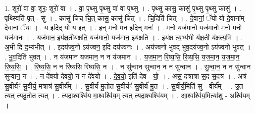\documentclass[17pt]{extarticle}
\begin{document}
1. शूरो॑ वा वा॒ शूरः॒ शूरो॑ वा । . वा॒ पृ॒थ्सु पृ॒थ्सु वा॑ वा पृ॒थ्सु । . पृ॒थ्सु कासु॒ कासु॑ पृ॒थ्सु पृ॒थ्सु कासु॑ । . पृ॒थ्स्विति॑ पृत् - सु । . कासु॑ चिच् चि॒त् कासु॒ कासु॑ चित् । . चि॒दिति॑ चित् । . दे॒वानां॒ ॅयो यो दे॒वाना᳚म् दे॒वानां॒ ॅयः । . य इदिद् यो य इत् । . इन् मनो॒ मन॒ इदिन् मनः॑ । . मनो॒ यज॑मानो॒ यज॑मानो॒ मनो॒ मनो॒ यज॑मानः । . यज॑मान॒ इय॑क्ष॒तीय॑क्षति॒ यज॑मानो॒ यज॑मान॒ इय॑क्षति । . इय॑क्ष त्य॒भ्य॑भी य॑क्ष॒ती य॑क्षत्य॒भि । . अ॒भी दि द॒भ्य॑भीत् । . इदय॑ज्व॒नो ऽय॑ज्वन॒ इदि दय॑ज्वनः । . अय॑ज्वनो भुवद् भुव॒दय॑ज्व॒नो ऽय॑ज्वनो भुवत् । . भु॒व॒दिति॑ भुवत् । . न य॑जमान यजमान॒ न न य॑जमान । . य॒ज॒मा॒न॒ रि॒ष्य॒सि॒ रि॒ष्य॒सि॒ य॒ज॒मा॒न॒ य॒ज॒मा॒न॒ रि॒ष्य॒सि॒ । . रि॒ष्य॒सि॒ न न रि॑ष्यसि रिष्यसि॒ न । . न सु॑न्वान सुन्वान॒ न न सु॑न्वान । . सु॒न्वा॒न॒ न न सु॑न्वान सुन्वान॒ न । . न दे॑वयो देवयो॒ न न दे॑वयो । . दे॒व॒यो॒ इति॑ देव - यो॒ । . अस॒ दत्रात्रा स॒द स॒दत्र॑ । . अत्र॑ सु॒वीर्यꣳ॑ सु॒वीर्य॒ मत्रात्र॑ सु॒वीर्य᳚म् । . सु॒वीर्य॑ मु॒तोत सु॒वीर्यꣳ॑ सु॒वीर्य॑ मु॒त । . सु॒वीर्य॒मिति॑ सु - वीर्य᳚म् । . उ॒त त्यत् त्यदु॒तोत त्यत् । . त्यदा॒श्वश्वि॑य मा॒श्वश्वि॑य॒म् त्यत् त्यदा॒श्वश्वि॑यम् । . आ॒श्वश्वि॑य॒मित्या॑शु - अश्वि॑यम् । \newline
\end{document}
